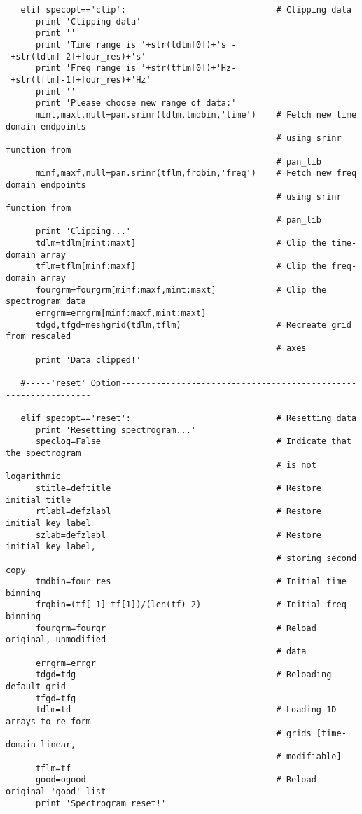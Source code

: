 \begin{verbatim}
   elif specopt=='clip':                              # Clipping data
      print 'Clipping data'
      print ''
      print 'Time range is '+str(tdlm[0])+'s - '+str(tdlm[-2]+four_res)+'s'
      print 'Freq range is '+str(tflm[0])+'Hz- '+str(tflm[-1]+four_res)+'Hz'
      print ''
      print 'Please choose new range of data:'
      mint,maxt,null=pan.srinr(tdlm,tmdbin,'time')    # Fetch new time domain endpoints
                                                      # using srinr function from
                                                      # pan_lib
      minf,maxf,null=pan.srinr(tflm,frqbin,'freq')    # Fetch new freq domain endpoints
                                                      # using srinr function from
                                                      # pan_lib
      print 'Clipping...'
      tdlm=tdlm[mint:maxt]                            # Clip the time-domain array
      tflm=tflm[minf:maxf]                            # Clip the freq-domain array
      fourgrm=fourgrm[minf:maxf,mint:maxt]            # Clip the spectrogram data
      errgrm=errgrm[minf:maxf,mint:maxt]
      tdgd,tfgd=meshgrid(tdlm,tflm)                   # Recreate grid from rescaled
                                                      # axes
      print 'Data clipped!'

   #-----'reset' Option----------------------------------------------------------------

   elif specopt=='reset':                             # Resetting data
      print 'Resetting spectrogram...'               
      speclog=False                                   # Indicate that the spectrogram
                                                      # is not logarithmic
      stitle=deftitle                                 # Restore initial title
      rtlabl=defzlabl                                 # Restore initial key label
      szlab=defzlabl                                  # Restore initial key label,
                                                      # storing second copy
      tmdbin=four_res                                 # Initial time binning
      frqbin=(tf[-1]-tf[1])/(len(tf)-2)               # Initial freq binning
      fourgrm=fourgr                                  # Reload original, unmodified
                                                      # data
      errgrm=errgr
      tdgd=tdg                                        # Reloading default grid
      tfgd=tfg
      tdlm=td                                         # Loading 1D arrays to re-form
                                                      # grids [time-domain linear,
                                                      # modifiable]
      tflm=tf
      good=ogood                                      # Reload original 'good' list
      print 'Spectrogram reset!'


\end{verbatim}
